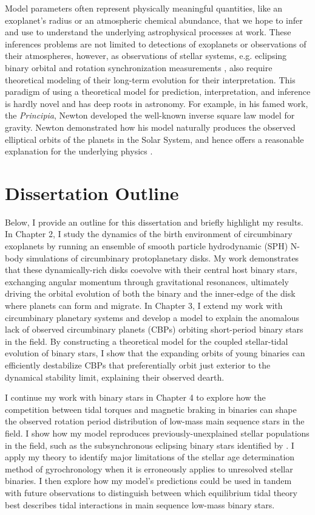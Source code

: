 Model parameters often represent physically meaningful quantities, like an exoplanet's radius or an atmospheric chemical abundance, that we hope to infer and use to understand the underlying astrophysical processes at work. These inferences problems are not limited to detections of exoplanets or observations of their atmospheres, however, as observations of stellar systems, e.g. \kepler eclipsing binary orbital and rotation synchronization measurements \citep[e.g.][]{McQuillan2014,Lurie2017}, also require theoretical modeling of their long-term evolution for their interpretation. This paradigm of using a theoretical model for prediction, interpretation, and inference is hardly novel and has deep roots in astronomy. For example, in his famed work, the \textit{Principia}, Newton developed the well-known inverse square law model for gravity. Newton demonstrated how his model naturally produces the observed elliptical orbits of the planets in the Solar System, and hence offers a reasonable explanation for the underlying physics \citep{Newton1687,Newton1999}.

\section{Dissertation Outline}

Below, I provide an outline for this dissertation and briefly highlight my results. In Chapter 2, I study the dynamics of the birth environment of circumbinary exoplanets by running an ensemble of smooth particle hydrodynamic (SPH) N-body simulations of circumbinary protoplanetary disks. My work demonstrates that these dynamically-rich disks coevolve with their central host binary stars, exchanging angular momentum through gravitational resonances, ultimately driving the orbital evolution of both the binary and the inner-edge of the disk where planets can form and migrate. In Chapter 3, I extend my work with circumbinary planetary systems and develop a model to explain the anomalous lack of observed circumbinary planets (CBPs) orbiting short-period binary stars in the \kepler field. By constructing a theoretical model for the coupled stellar-tidal evolution of binary stars, I show that the expanding orbits of young binaries can efficiently destabilize CBPs that preferentially orbit just exterior to the dynamical stability limit, explaining their observed dearth.

I continue my work with binary stars in Chapter 4 to explore how the competition between tidal torques and magnetic braking in binaries can shape the observed rotation period distribution of low-mass main sequence stars in the \kepler field. I show how my model reproduces previously-unexplained stellar populations in the \kepler field, such as the subsynchronous eclipsing binary stars identified by \citet{Lurie2017}. I apply my theory to identify major limitations of the stellar age determination method of gyrochronology when it is erroneously applies to unresolved stellar binaries. I then explore how my model's predictions could be used in tandem with future observations to distinguish between which equilibrium tidal theory best describes tidal interactions in main sequence low-mass binary stars.

